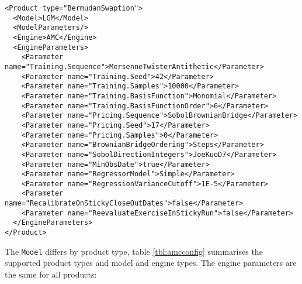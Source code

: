 \documentclass[12pt, a4paper]{article}
\begin{document}
\begin{verbatim}
<Product type="BermudanSwaption">
  <Model>LGM</Model>
  <ModelParameters/>
  <Engine>AMC</Engine>
  <EngineParameters>
    <Parameter name="Training.Sequence">MersenneTwisterAntithetic</Parameter>
    <Parameter name="Training.Seed">42</Parameter>
    <Parameter name="Training.Samples">10000</Parameter>
    <Parameter name="Training.BasisFunction">Monomial</Parameter>
    <Parameter name="Training.BasisFunctionOrder">6</Parameter>
    <Parameter name="Pricing.Sequence">SobolBrownianBridge</Parameter>
    <Parameter name="Pricing.Seed">17</Parameter>
    <Parameter name="Pricing.Samples">0</Parameter>
    <Parameter name="BrownianBridgeOrdering">Steps</Parameter>
    <Parameter name="SobolDirectionIntegers">JoeKuoD7</Parameter>
    <Parameter name="MinObsDate">true</Parameter>
    <Parameter name="RegressorModel">Simple</Parameter>
    <Parameter name="RegressionVarianceCutoff">1E-5</Parameter>
    <Parameter name="RecalibrateOnStickyCloseOutDates">false</Parameter>
    <Parameter name="ReevaluateExerciseInStickyRun">false</Parameter>
  </EngineParameters>
</Product>
\end{verbatim}

The \verb+Model+ differs by product type, table \ref{tbl:amcconfig} summarises the supported product types and model and
engine types. The engine parameters are the same for all products:
\end{document}
